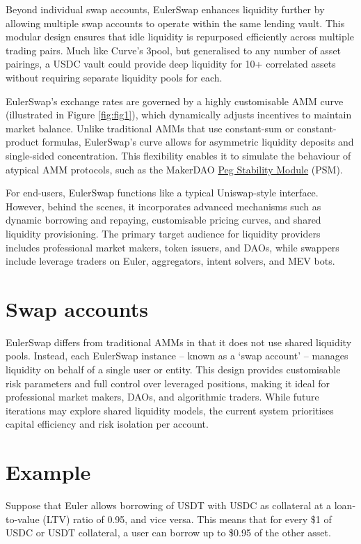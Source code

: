 \documentclass{article}
\begin{document}
Beyond individual swap accounts, EulerSwap enhances liquidity further by allowing multiple swap accounts to operate within the same lending vault. This modular design ensures that idle liquidity is repurposed efficiently across multiple trading pairs. Much like Curve’s 3pool, but generalised to any number of asset pairings, a USDC vault could provide deep liquidity for 10+ correlated assets without requiring separate liquidity pools for each.

EulerSwap’s exchange rates are governed by a highly customisable AMM curve (illustrated in Figure \ref{fig:fig1}), which dynamically adjusts incentives to maintain market balance. Unlike traditional AMMs that use constant-sum or constant-product formulas, EulerSwap’s curve allows for asymmetric liquidity deposits and single-sided concentration. This flexibility enables it to simulate the behaviour of atypical AMM protocols, such as the MakerDAO \href{https://mips.makerdao.com/mips/details/MIP29}{Peg Stability Module} (PSM).

For end-users, EulerSwap functions like a typical Uniswap-style interface. However, behind the scenes, it incorporates advanced mechanisms such as dynamic borrowing and repaying, customisable pricing curves, and shared liquidity provisioning. The primary target audience for liquidity providers includes professional market makers, token issuers, and DAOs, while swappers include leverage traders on Euler, aggregators, intent solvers, and MEV bots. 

\section{Swap accounts}

EulerSwap differs from traditional AMMs in that it does not use shared liquidity pools. Instead, each EulerSwap instance -- known as a `swap account' -- manages liquidity on behalf of a single user or entity. This design provides customisable risk parameters and full control over leveraged positions, making it ideal for professional market makers, DAOs, and algorithmic traders. While future iterations may explore shared liquidity models, the current system prioritises capital efficiency and risk isolation per account.

\section{Example}

Suppose that Euler allows borrowing of USDT with USDC as collateral at a loan-to-value (LTV) ratio of 0.95, and vice versa. This means that for every \$1 of USDC or USDT collateral, a user can borrow up to \$0.95 of the other asset. 
\end{document}
